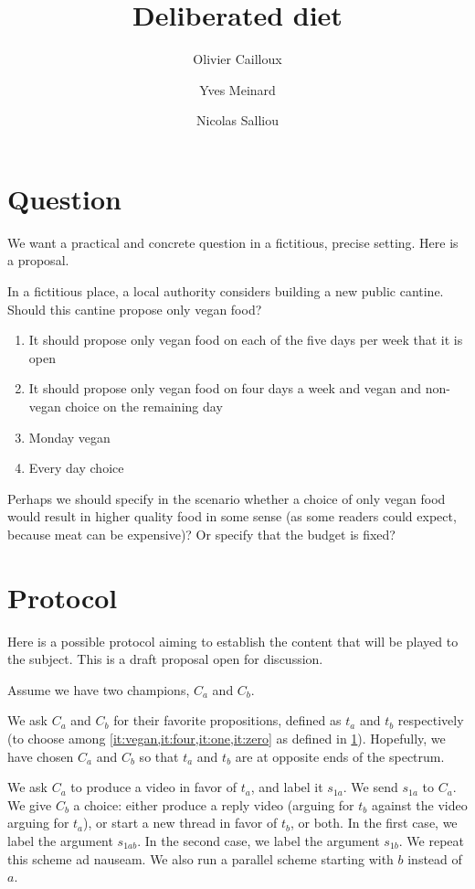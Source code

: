 \documentclass[version=3.21, pagesize, twoside=off, bibliography=totoc, DIV=calc, fontsize=12pt, a4paper]{scrartcl}
\title{Deliberated diet}
\author{Olivier Cailloux}
\author{Yves Meinard}
\affil{Université Paris-Dauphine, PSL Research University, CNRS, LAMSADE, 75016 PARIS, FRANCE}
\author{Nicolas Salliou}
\affil{Affiliation}
\begin{document}
\maketitle

\section{Question}
\label{sec:question}
We want a practical and concrete question in a fictitious, precise setting. Here is a proposal.

In a fictitious place, a local authority considers building a new public cantine. Should this cantine propose only vegan food?
\begin{enumerate}
	\item \label{it:vegan} It should propose only vegan food on each of the five days per week that it is open
	\item \label{it:four} It should propose only vegan food on four days a week and vegan and non-vegan choice on the remaining day
	\item \label{it:one} Monday vegan
	\item \label{it:zero} Every day choice
\end{enumerate}
Perhaps we should specify in the scenario whether a choice of only vegan food would result in higher quality food in some sense (as some readers could expect, because meat can be expensive)? Or specify that the budget is fixed?

\section{Protocol}
\label{sec:prot}
Here is a possible protocol aiming to establish the content that will be played to the subject. This is a draft proposal open for discussion.

Assume we have two champions, $C_a$ and $C_b$.

We ask $C_a$ and $C_b$ for their favorite propositions, defined as $t_a$ and $t_b$ respectively (to choose among \cref{it:vegan,it:four,it:one,it:zero} as defined in \cref{sec:question}). Hopefully, we have chosen $C_a$ and $C_b$ so that $t_a$ and $t_b$ are at opposite ends of the spectrum.

We ask $C_a$ to produce a video in favor of $t_a$, and label it $s_{1a}$. We send $s_{1a}$ to $C_a$. We give $C_b$ a choice: either produce a reply video (arguing for $t_b$ against the video arguing for $t_a$), or start a new thread in favor of $t_b$, or both. In the first case, we label the argument $s_{1ab}$. In the second case, we label the argument $s_{1b}$. We repeat this scheme ad nauseam. We also run a parallel scheme starting with $b$ instead of $a$.
\end{document}
